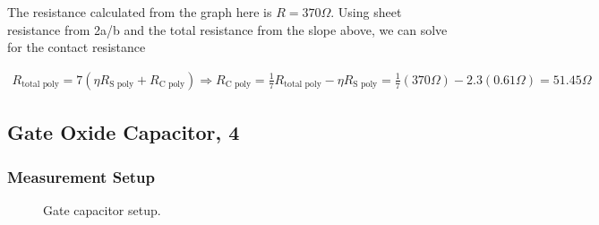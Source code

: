 \documentclass{article}
\begin{document}
The resistance calculated from the graph here is $R = 370 \Omega$. Using sheet resistance from 2a/b and the total resistance from the slope above, we can solve for the contact resistance

\begin{align*}
R_{\text{total poly}} = 7(\eta R_{\text{S poly}} + R_{\text{C poly}}) \Rightarrow R_{\text{C poly}} = \frac{1}{7}R_{\text{total poly}} - \eta R_{\text{S poly}} = \frac{1}{7}(370 \Omega) - 2.3(0.61 \Omega) = 51.45 \Omega
\end{align*}


\subsection{Gate Oxide Capacitor, 4} %

\subsubsection{Measurement Setup}
\begin{figure}[H]
\centering
{}
\caption{Gate capacitor setup.}
\end{figure}
\end{document}
